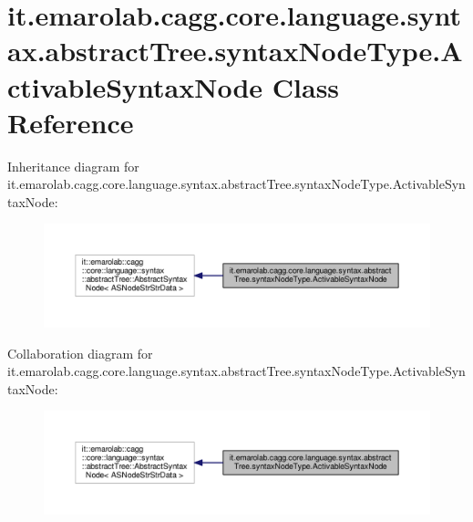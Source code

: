 \hypertarget{classit_1_1emarolab_1_1cagg_1_1core_1_1language_1_1syntax_1_1abstractTree_1_1syntaxNodeType_1_1ActivableSyntaxNode}{\section{it.\-emarolab.\-cagg.\-core.\-language.\-syntax.\-abstract\-Tree.\-syntax\-Node\-Type.\-Activable\-Syntax\-Node Class Reference}
\label{classit_1_1emarolab_1_1cagg_1_1core_1_1language_1_1syntax_1_1abstractTree_1_1syntaxNodeType_1_1ActivableSyntaxNode}
}


Inheritance diagram for it.\-emarolab.\-cagg.\-core.\-language.\-syntax.\-abstract\-Tree.\-syntax\-Node\-Type.\-Activable\-Syntax\-Node\-:\nopagebreak
\begin{figure}[H]
\begin{center}
\leavevmode
\includegraphics[width=350pt]{classit_1_1emarolab_1_1cagg_1_1core_1_1language_1_1syntax_1_1abstractTree_1_1syntaxNodeType_1_1A71588bc93a579aa38e47bc636bdb829c}
\end{center}
\end{figure}


Collaboration diagram for it.\-emarolab.\-cagg.\-core.\-language.\-syntax.\-abstract\-Tree.\-syntax\-Node\-Type.\-Activable\-Syntax\-Node\-:\nopagebreak
\begin{figure}[H]
\begin{center}
\leavevmode
\includegraphics[width=350pt]{classit_1_1emarolab_1_1cagg_1_1core_1_1language_1_1syntax_1_1abstractTree_1_1syntaxNodeType_1_1ActivableSyntaxNode__coll__graph}
\end{center}
\end{figure}
